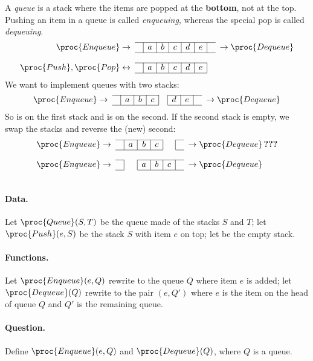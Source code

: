 A \emph{queue} is a stack where the items are popped at the
\textbf{bottom}, not at the top. Pushing an item in a queue is called
\emph{enqueuing}, whereas the special pop is called \emph{dequeuing}.
\[
\begin{array}{r@{\;}cc|c|c|c|c|c|cc@{\;}l}
\cline{3-9}
\proc{Enqueue} & \rightarrow & & a & b & c & d & e & & \rightarrow &
\proc{Dequeue}\\
\cline{3-9}\\
\cline{3-8}
\proc{Push}, \proc{Pop} & \leftrightarrow & & a & b & c & d & e &&&\\ 
\cline{3-8}
\end{array}
\]
\noindent We want to implement queues with two stacks:
\[
\begin{array}{r@{\;}cc|c|c|c|c|c|c|cc@{\;}l}
\cline{3-6}\cline{8-10}
\proc{Enqueue} & \rightarrow & & a & b & c & & d & e & & \rightarrow &
\proc{Dequeue}\\
\cline{3-6}\cline{8-10}
\end{array}
\]
\noindent So  is  on the first stack and
 is  on the second. If the second stack is
empty, we swap the stacks and reverse the (new) second:
\[
\begin{array}{r@{\;}cc|c|c|c|c|cc@{\;}l}
\cline{3-6}\cline{8-8}
\proc{Enqueue} & \rightarrow & & a & b & c & & & \rightarrow &
\proc{Dequeue} \, \textbf{???}\\
\cline{3-6}\cline{8-8}\\
\cline{3-3}\cline{5-8}
\proc{Enqueue} & \rightarrow & & & a & b & c & & \rightarrow &
\proc{Dequeue}\\
\cline{3-3}\cline{5-8}\\
\end{array}
\]
\paragraph{Data.} \noindent Let \(\proc{Queue}(S,T)\) be the
queue made of the stacks \(S\) and \(T\); let \(\proc{Push}(e,S)\) be
the stack \(S\) with item \(e\) on top; let  be the empty
stack.

\paragraph{Functions.} Let \(\proc{Enqueue}(e,Q)\) rewrite to
the queue \(Q\) where item \(e\) is added; let \(\proc{Dequeue}(Q)\)
rewrite to the pair \((e, Q')\) where \(e\) is the item on the head of
queue \(Q\) and \(Q'\) is the remaining queue.

\paragraph{Question.} Define \(\proc{Enqueue}(e,Q)\) and
\(\proc{Dequeue}(Q)\), where \(Q\) is a queue.
